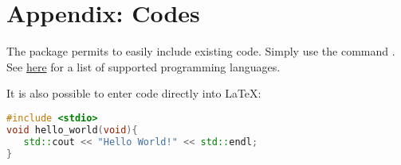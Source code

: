 


\section{Appendix: Codes}
\label{section4}

The package \href{https://www.overleaf.com/learn/latex/Code\_listing}{} permits to easily include existing code. Simply use the command \verb||. See \href{https://www.overleaf.com/learn/latex/Code\_listing#Supported\_languages}{here} for a list of supported programming languages.




It is also possible to enter code directly into \LaTeX:

\begin{lstlisting}[language=C++]
#include <stdio>
void hello_world(void){
   std::cout << "Hello World!" << std::endl;
}    
\end{lstlisting}

%
%
%
%
%
%
%
%
%

